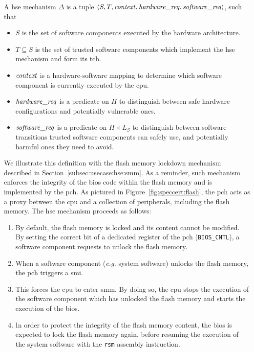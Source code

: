 \begin{definition}
  \label{def:speccert:hse}
  A \ac{hse} mechanism $\Delta$ is a tuple
  $\langle S, T, \mathit{context}, \mathit{hardware\_req}, \mathit{software\_req}
  \rangle$, such that
  \begin{itemize}
  \item $S$ is the set of software components executed by the hardware
    architecture.
  \item $T \subseteq S$ is the set of trusted software components which
    implement the \ac{hse} mechanism and form its \ac{tcb}.
  \item $\mathit{context}$ is a hardware-software mapping to determine which
    software component is currently executed by the \ac{cpu}.
  \item $\mathit{hardware\_req}$ is a predicate on $H$ to distinguish between safe
    hardware configurations and potentially vulnerable ones.
  \item $\mathit{software\_req}$ is a predicate on $H \times L_S$ to distinguish
    between software transitions trusted software components can safely use, and
    potentially harmful ones they need to avoid.
  \end{itemize}
\end{definition}

We illustrate this definition with the flash memory lockdown mechanism described
in Section~\ref{subsec:usecase:hse:smm}.
%
As a reminder, such mechanism enforces the integrity of the \ac{bios} code
within the flash memory and is implemented by the \ac{pch}.
%
As pictured in Figure~\ref{fig:speccert:flash}, the \ac{pch} acts as a proxy
between the \ac{cpu} and a collection of peripherals, including the flash
memory.
%
The \ac{hse} mechanism proceeds as follows:
%
\begin{enumerate}
\item By default, the flash memory is locked and its content cannot be modified.
  By setting the correct bit of a dedicated register of the \ac{pch}
  (\texttt{BIOS\_CNTL}), a software component requests to unlock the flash
  memory.
%
\item When a software component (\emph{e.g.} system software) unlocks the flash
  memory, the \ac{pch} triggers a \ac{smi}.
%
\item This forces the \ac{cpu} to enter \ac{smm}.
  By doing so, the \ac{cpu} stops the execution of the software component which
  has unlocked the flash memory and starts the execution of the \ac{bios}.
%
\item In order to protect the integrity of the flash memory content, the
  \ac{bios} is expected to lock the flash memory again, before resuming the
  execution of the system software with the \texttt{rsm} assembly instruction.
\end{enumerate}

